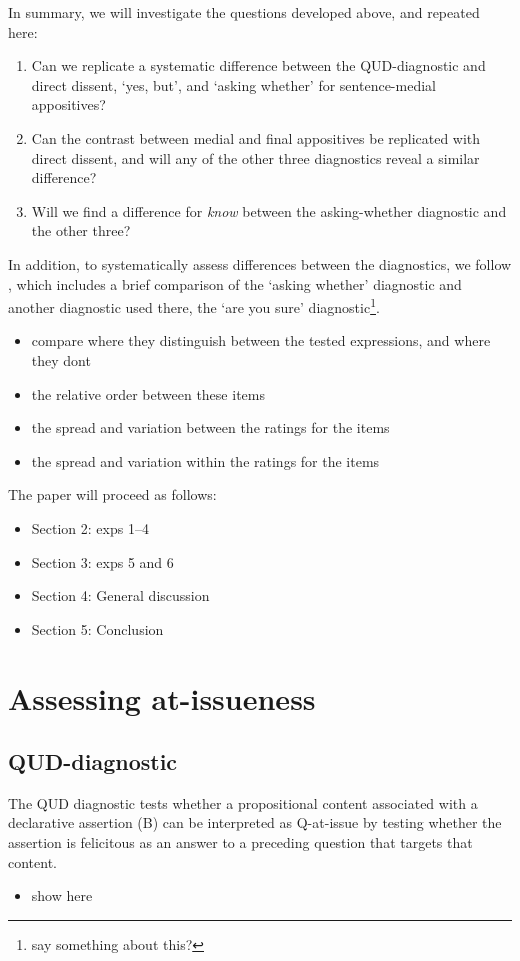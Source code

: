 \documentclass[times,linguex,xcolor]{glossa}
\begin{document}
  In summary, we will investigate the questions developed above, and repeated here:
    \begin{enumerate}
      \item Can we replicate a systematic difference between the QUD-diagnostic and direct dissent, ‘yes, but’, and `asking whether' for sentence-medial appositives?
      \item Can the contrast between medial and final appositives be replicated with direct dissent, and will any of the other three diagnostics reveal a similar difference?
      \item Will we find a difference for \emph{know} between the asking-whether diagnostic and the other three?
    \end{enumerate}

  In addition, to systematically assess differences between the diagnostics, we follow \citealt{tonhauser_how_2018}, which includes a brief comparison of the `asking whether' diagnostic and another diagnostic used there, the `are you sure' diagnostic\footnote{say something about this?}.

  \begin{itemize}
    \item compare where they distinguish between the tested expressions, and where they dont
    \item the relative order between these items
    \item the spread and variation between the ratings for the items
    \item the spread and variation within the ratings for the items
  \end{itemize}

  The paper will proceed as follows:
  \begin{itemize}
    \item Section 2: exps 1--4
    \item Section 3: exps 5 and 6
    \item Section 4: General discussion
    \item Section 5: Conclusion

  \end{itemize}


\section{Assessing at-issueness}
  \subsection{QUD-diagnostic}
    The QUD diagnostic tests whether a propositional content associated with a declarative assertion (B) can be interpreted as Q-at-issue by testing whether the assertion is felicitous as an answer to a preceding question that targets that content.
    \begin{itemize}
      \item show here
    \end{itemize}
\end{document}
